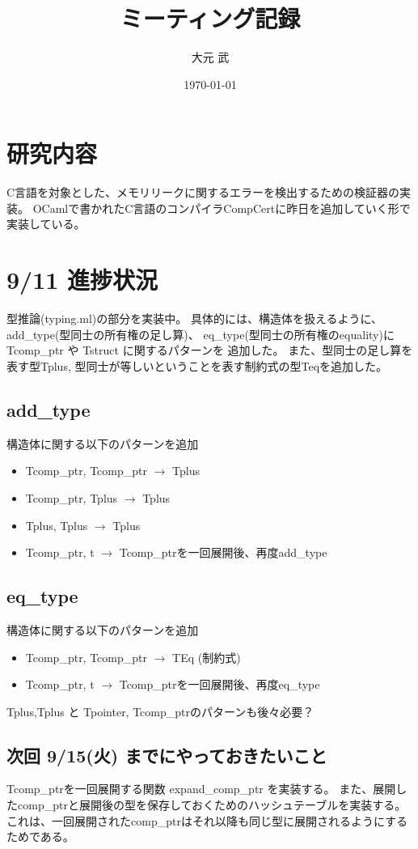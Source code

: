 \documentclass[a4j,proof]{jarticle}
\title{ミーティング記録}
\author{大元 武}
\date{\today}
\begin{document}
\maketitle

\section{研究内容}
C言語を対象とした、メモリリークに関するエラーを検出するための検証器の実装。
OCamlで書かれたC言語のコンパイラCompCertに昨日を追加していく形で実装している。

\section{9/11 進捗状況}
型推論(typing.ml)の部分を実装中。
具体的には、構造体を扱えるように、add\_type(型同士の所有権の足し算)、
eq\_type(型同士の所有権のequality)に Tcomp\_ptr や Tstruct に関するパターンを
追加した。
また、型同士の足し算を表す型Tplus, 型同士が等しいということを表す制約式の型Teqを追加した。

\subsection{add\_type}
構造体に関する以下のパターンを追加
\begin{itemize}
  \item Tcomp\_ptr, Tcomp\_ptr $\rightarrow$ Tplus
  \item Tcomp\_ptr, Tplus $\rightarrow$ Tplus
  \item Tplus, Tplus $\rightarrow$ Tplus
  \item Tcomp\_ptr, t $\rightarrow$ Tcomp\_ptrを一回展開後、再度add\_type
\end{itemize}

\subsection{eq\_type}
構造体に関する以下のパターンを追加
\begin{itemize}
  \item Tcomp\_ptr, Tcomp\_ptr $\rightarrow$ TEq (制約式)
  \item Tcomp\_ptr, t $\rightarrow$ Tcomp\_ptrを一回展開後、再度eq\_type
\end{itemize}
Tplus,Tplus と Tpointer, Tcomp\_ptrのパターンも後々必要？

\subsection{次回 9/15(火) までにやっておきたいこと}
Tcomp\_ptrを一回展開する関数 expand\_comp\_ptr を実装する。
また、展開したcomp\_ptrと展開後の型を保存しておくためのハッシュテーブルを実装する。
これは、一回展開されたcomp\_ptrはそれ以降も同じ型に展開されるようにするためである。
\end{document}
